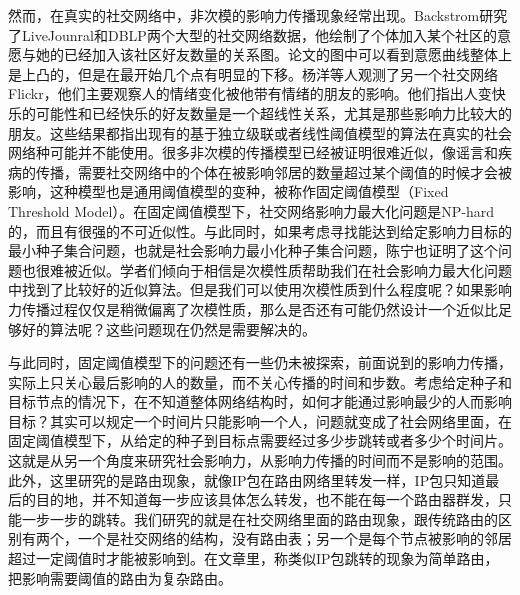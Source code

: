 然而，在真实的社交网络中，非次模的影响力传播现象经常出现。Backstrom\cite{backstrom2006group}研究了LiveJounral和DBLP两个大型的社交网络数据，他绘制了个体加入某个社区的意愿与她的已经加入该社区好友数量的关系图。论文的图中可以看到意愿曲线整体上是上凸的，但是在最开始几个点有明显的下移。杨洋\cite{yang2016role}等人观测了另一个社交网络Flickr，他们主要观察人的情绪变化被他带有情绪的朋友的影响。他们指出人变快乐的可能性和已经快乐的好友数量是一个超线性关系，尤其是那些影响力比较大的朋友。这些结果都指出现有的基于独立级联或者线性阈值模型的算法在真实的社会网络种可能并不能使用。很多非次模的传播模型已经被证明很难近似，像谣言和疾病的传播，需要社交网络中的个体在被影响邻居的数量超过某个阈值的时候才会被影响，这种模型也是通用阈值模型的变种，被称作固定阈值模型（Fixed Threshold Model）。在固定阈值模型下，社交网络影响力最大化问题是NP-hard的，而且有很强的不可近似性\cite{Kempe2003maximizing}。与此同时，如果考虑寻找能达到给定影响力目标的最小种子集合问题，也就是社会影响力最小化种子集合问题，陈宁也证明了这个问题也很难被近似\cite{Chen2008approximability}。学者们倾向于相信是次模性质帮助我们在社会影响力最大化问题中找到了比较好的近似算法。但是我们可以使用次模性质到什么程度呢？如果影响力传播过程仅仅是稍微偏离了次模性质，那么是否还有可能仍然设计一个近似比足够好的算法呢？这些问题现在仍然是需要解决的。

与此同时，固定阈值模型下的问题还有一些仍未被探索，前面说到的影响力传播，实际上只关心最后影响的人的数量，而不关心传播的时间和步数。考虑给定种子和目标节点的情况下，在不知道整体网络结构时，如何才能通过影响最少的人而影响目标？其实可以规定一个时间片只能影响一个人，问题就变成了社会网络里面，在固定阈值模型下，从给定的种子到目标点需要经过多少步跳转或者多少个时间片。这就是从另一个角度来研究社会影响力，从影响力传播的时间而不是影响的范围。此外，这里研究的是路由现象，就像IP包在路由网络里转发一样，IP包只知道最后的目的地，并不知道每一步应该具体怎么转发，也不能在每一个路由器群发，只能一步一步的跳转。我们研究的就是在社交网络里面的路由现象，跟传统路由的区别有两个，一个是社交网络的结构，没有路由表；另一个是每个节点被影响的邻居超过一定阈值时才能被影响到。在文章里，称类似IP包跳转的现象为简单路由，把影响需要阈值的路由为复杂路由。

